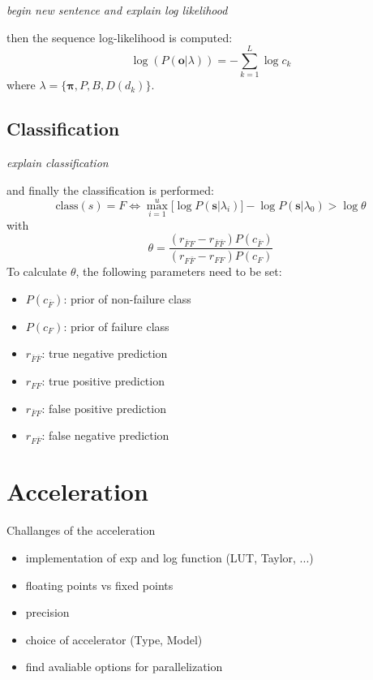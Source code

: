 \documentclass[mscthesis]{usiinfthesis}
\begin{document}
\emph{\color{red}begin new sentence and explain log likelihood}

then the sequence log-likelihood is computed:
\begin{equation}
    \log(P(\boldsymbol{o}|\lambda)) = -\sum\limits_{k=1}^{L} \log c_k
\end{equation}
where $ \lambda = \{\boldsymbol{\pi}, P, B, D(d_k) \} $.

\section{Classification}
\label{ch:event_class}

\emph{\color{red}explain classification}

and finally the
classification is performed:
\begin{equation}
    \label{eq:class}
    \text{class}(s) = F \iff \max_{i=1}^{u} \big [
        \log P(\boldsymbol{s}|\lambda_i)
    \big ] - \log P(\boldsymbol{s}|\lambda_0) > \log \theta
\end{equation}
with
\begin{equation}
    \label{eq:class_thresh}
    \theta = \frac{(r_{\bar{F}F} - r_{\bar{F}\bar{F}})P(c_{\bar{F}})}
        {(r_{F \bar{F}} - r_{FF})P(c_{F})}
\end{equation}
To calculate $ \theta $, the following parameters need to be set:
\begin{itemize}
    \item $ P(c_{\bar{F}}) $: prior of non-failure class
    \item $ P(c_F) $: prior of failure class
    \item $ r_{\bar{F}\bar{F}} $: true negative prediction
    \item $ r_{FF} $: true positive prediction
    \item $ r_{\bar{F}F} $: false positive prediction
    \item $ r_{F\bar{F}} $: false negative prediction
\end{itemize}

\chapter{Acceleration}
\label{ch:acc}

Challanges of the acceleration
\begin{itemize}
    \item implementation of exp and log function (LUT, Taylor, ...)
    \item floating points vs fixed points
    \item precision
    \item choice of accelerator (Type, Model)
    \item find avaliable options for parallelization
\end{itemize}
\end{document}

